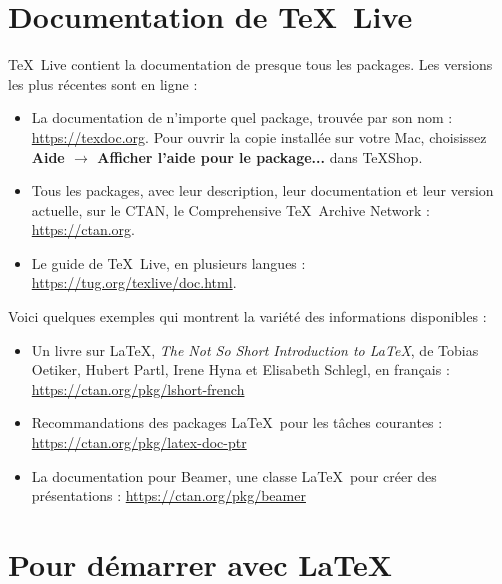 \documentclass[11pt, oneside]{article}
\begin{document}
\pagestyle{empty}

\section{Documentation de \TeX\ Live}

\TeX\ Live contient la documentation de presque tous les packages. Les versions les plus récentes sont en ligne :

\begin{itemize}
\item La documentation de n'importe quel package, trouvée par son nom :
\url{https://texdoc.org}. Pour ouvrir la copie installée sur votre Mac, choisissez
\textbf{Aide $\rightarrow$ Afficher l'aide pour le package...} dans TeXShop.

\item Tous les packages, avec leur description, leur documentation et leur version actuelle, sur
le CTAN, le Comprehensive \TeX\ Archive Network : \url{https://ctan.org}.

\item Le guide de \TeX\ Live, en plusieurs langues :
\url{https://tug.org/texlive/doc.html}.
\end{itemize}

Voici quelques exemples qui montrent la variété des informations disponibles :

\begin{itemize}

\item Un livre sur \LaTeX, \emph{The Not So Short Introduction to \LaTeX}, de Tobias Oetiker, Hubert Partl, Irene Hyna et Elisabeth Schlegl, en français :
\url{https://ctan.org/pkg/lshort-french}

\item Recommandations des packages \LaTeX\ pour les tâches courantes : \url{https://ctan.org/pkg/latex-doc-ptr}

\item La documentation pour Beamer, une classe \LaTeX\ pour créer des présentations :
\url{https://ctan.org/pkg/beamer}

\end{itemize}

\section{Pour démarrer avec \LaTeX}
\end{document}
